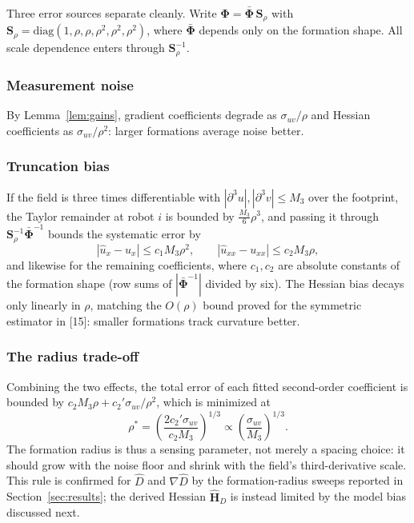 \documentclass[lettersize,journal]{IEEEtran}
\begin{document}
Three error sources separate cleanly. Write $\boldsymbol{\Phi} =
\bar{\boldsymbol{\Phi}}\,\mathbf{S}_\rho$ with $\mathbf{S}_\rho =
\mathrm{diag}(1, \rho, \rho, \rho^2, \rho^2, \rho^2)$, where
$\bar{\boldsymbol{\Phi}}$ depends only on the formation shape. All
scale dependence enters through $\mathbf{S}_\rho^{-1}$.

\subsubsection{Measurement noise}
By Lemma~\ref{lem:gains}, gradient coefficients degrade as
$\sigma_{uv}/\rho$ and Hessian coefficients as $\sigma_{uv}/\rho^2$:
larger formations average noise better.

\subsubsection{Truncation bias}
If the field is three times differentiable with
$|\partial^3 u|, |\partial^3 v| \leq M_3$ over the footprint, the Taylor
remainder at robot $i$ is bounded by $\tfrac{M_3}{6}\rho^3$, and passing
it through $\mathbf{S}_\rho^{-1}\bar{\boldsymbol{\Phi}}^{-1}$ bounds the
systematic error by
\begin{equation}
    |\hat{u}_x - u_x| \leq c_1 M_3 \rho^2, \qquad
    |\hat{u}_{xx} - u_{xx}| \leq c_2 M_3 \rho,
    \label{eq:truncation}
\end{equation}
and likewise for the remaining coefficients, where $c_1, c_2$ are
absolute constants of the formation shape (row sums of
$|\bar{\boldsymbol{\Phi}}^{-1}|$ divided by six). The Hessian bias decays
only linearly in $\rho$, matching the $O(\rho)$ bound proved for the
symmetric estimator in [15]: smaller formations track curvature better.

\subsubsection{The radius trade-off}
Combining the two effects, the total error of each fitted second-order
coefficient is bounded by
$c_2 M_3 \rho + c_2' \sigma_{uv}/\rho^2$, which is minimized at
\begin{equation}
    \rho^* = \left(\frac{2 c_2' \sigma_{uv}}{c_2 M_3}\right)^{1/3}
    \propto \left(\frac{\sigma_{uv}}{M_3}\right)^{1/3}.
    \label{eq:rho_star}
\end{equation}
The formation radius is thus a sensing parameter, not merely a spacing
choice: it should grow with the noise floor and shrink with the field's
third-derivative scale. This rule is confirmed for $\hat{D}$ and
$\nabla\hat{D}$ by the formation-radius sweeps reported in
Section~\ref{sec:results}; the derived Hessian $\hat{\mathbf{H}}_D$ is
instead limited by the model bias discussed next.
\end{document}
